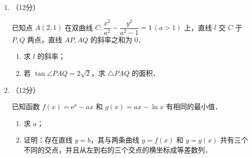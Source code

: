 \begin{description}
\begin{enumerate}[leftmargin=5pt]
        \textsf{[插入表格：卫生习惯数据]}

        \begin{enumerate}[label=(\arabic*)]
            \item 能否有 $99\%$ 的把握认为患该疾病群体与未患该疾病群体的卫生习惯有差异？
            \item 从该地的人群中任选一人，$A$ 表示事件"选到的人卫生习惯不够良好"，$B$ 表示事件"选到的人患有该疾病"，$\dfrac{P(B\mid A)}{P(\bar{B}\mid A)}$ 与 $\dfrac{P(B\mid\bar{A})}{P(\bar{B}\mid\bar{A})}$ 的比值是卫生习惯不够良好对患该疾病风险程度的一项度量指标，记该指标为 $R$．
            \begin{enumerate}[label=(\roman*)]
                \item 证明：$R=\dfrac{P(A\mid B)}{P(\bar{A}\mid B)}\cdot\dfrac{P(\bar{A}\mid\bar{B})}{P(A\mid\bar{B})}$；
                \item 利用该调查数据，给出 $P(A\mid B),P(A\mid\bar{B})$ 的估计值，并利用（i）的结果给出 $R$ 的估计值．
            \end{enumerate}

            附：$K^2=\dfrac{n(ad-bc)^2}{(a+b)(c+d)(a+c)(b+d)}$，$P(K^2\geqslant k)$：0.050--3.841，0.010--6.635，0.001--10.828．
        \end{enumerate}

        \item （12分）

        已知点 $A(2,1)$ 在双曲线 $C:\dfrac{x^2}{a^2}-\dfrac{y^2}{a^2-1}=1\,(a>1)$ 上，直线 $l$ 交 $C$ 于 $P,Q$ 两点，直线 $AP,AQ$ 的斜率之和为 $0$．

        \begin{enumerate}[label=(\arabic*)]
            \item 求 $l$ 的斜率；
            \item 若 $\tan\angle PAQ=2\sqrt{2}$，求 $\triangle PAQ$ 的面积．
        \end{enumerate}

        \item （12分）

        已知函数 $f(x)=\mathrm{e}^x-ax$ 和 $g(x)=ax-\ln x$ 有相同的最小值．

        \begin{enumerate}[label=(\arabic*)]
            \item 求 $a$；
            \item 证明：存在直线 $y=b$，其与两条曲线 $y=f(x)$ 和 $y=g(x)$ 共有三个不同的交点，并且从左到右的三个交点的横坐标成等差数列．
        \end{enumerate}
    \end{enumerate}
\end{description}
\clearpage


